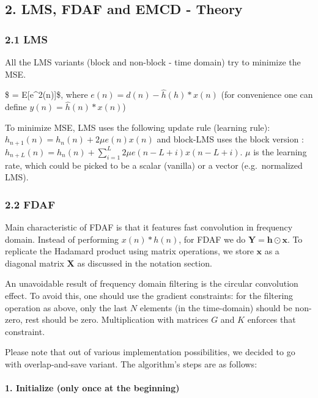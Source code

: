 \documentclass[11pt]{article}
\begin{document}
    \hypertarget{lms-fdaf-and-emcd---theory}{%
\subsection{2. LMS, FDAF and EMCD -
Theory}\label{lms-fdaf-and-emcd---theory}}

\hypertarget{lms}{%
\subsubsection{2.1 LMS}\label{lms}}

All the LMS variants (block and non-block - time domain) try to minimize
the MSE.

\$ \zeta = E{[}e\^{}2(n){]}\$, where \(e(n) = d(n) - \hat{h}(h)*x(n)\)
(for convenience one can define \(y(n) = \hat{h}(n) * x(n)\))

To minimize MSE, LMS uses the following update rule (learning rule):
\(h_{n+1}(n) = h_{n}(n) + 2\mu e(n)x(n)\) and block-LMS uses the block
version :
\(h_{n+L}(n) = h_{n}(n) + \sum_{i=1}^{L} 2\mu e(n-L+i)x(n-L+i)\).
\(\mu\) is the learning rate, which could be picked to be a scalar
(vanilla) or a vector (e.g.~normalized LMS).

\hypertarget{fdaf}{%
\subsubsection{2.2 FDAF}\label{fdaf}}

Main characteristic of FDAF is that it features fast convolution in
frequency domain. Instead of performing \(x(n) * h(n)\), for FDAF we do
\(\mathbf{Y = \mathbf{h} \odot \mathbf{x}}\). To replicate the Hadamard
product using matrix operations, we store \(\mathbf{x}\) as a diagonal
matrix \(\mathbf{X}\) as discussed in the notation section.

An unavoidable result of frequency domain filtering is the circular
convolution effect. To avoid this, one should use the gradient
constraints: for the filtering operation as above, only the last \(N\)
elements (in the time-domain) should be non-zero, rest should be zero.
Multiplication with matrices \(G\) and \(K\) enforces that constraint.

Please note that out of various implementation possibilities, we decided
to go with overlap-and-save variant. The algorithm's steps are as
follows:

\hypertarget{initialize-only-once-at-the-beginning}{%
\paragraph{1. Initialize (only once at the
beginning)}\label{initialize-only-once-at-the-beginning}}
\end{document}
